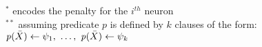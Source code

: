 \begin{table}
{\begin{tabular}{l|r||cl|r}
        \end{tabular}
    }
    \begin{center}\scriptsize
        $^{*}$ encodes the penalty for the $i^{th}$ neuron
        \\
        \smallskip
        $^{**}$ assuming predicate $p$ is defined by $k$ clauses of the form:
        \\
        $\pred{p}(\bar{X}) \leftarrow \psi_1,\ \ldots,\ \pred{p}(\bar{X}) \leftarrow \psi_k$
    \end{center}
\end{table}
